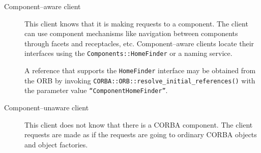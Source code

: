 \begin{description}
\item [Component--aware client]
This client knows that it is making requests to a component. The client can use
component mechanisms like navigation between components through facets and
receptacles, etc. Component--aware clients locate their interfaces using the
{\tt Components::HomeFinder} or a naming service.

A reference that supports the {\tt HomeFinder} interface may be obtained from
the ORB by invoking {\tt CORBA::ORB::resolve\_initial\_references()} with the
parameter value {\tt ``ComponentHomeFinder''}.

\item [Component--unaware client]
This client does not know that there is a CORBA component. The client requests
are made as if the requests are going to ordinary CORBA objects and object
factories.
\end{description}
